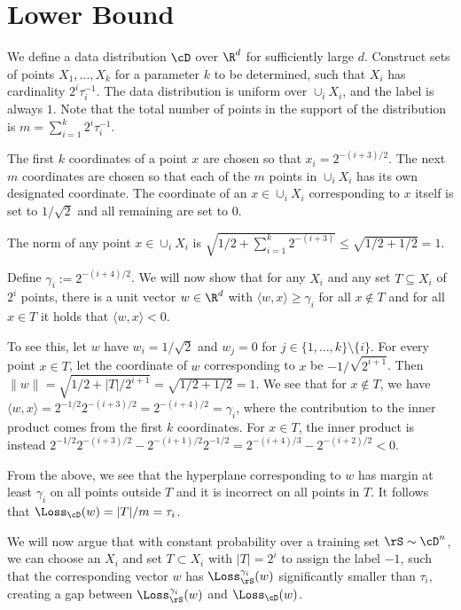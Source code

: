 \section{Lower Bound}
We define a data distribution $\cD$ over $\R^d$ for sufficiently large $d$. Construct sets of points $X_1,\dots,X_k$ for a parameter $k$ to be determined, such that $X_i$ has cardinality $2^i \tau_i^{-1}$. The data distribution is uniform over $\cup_i X_i$, and the label is always $1$. Note that the total number of points in the support of the distribution is $m=\sum_{i=1}^k 2^i \tau_i^{-1}$. 

The first $k$ coordinates of a point $x$ are chosen so that $x_i = 2^{-(i+3)/2}$. The next $m$ coordinates are chosen so that each of the $m$ points in $\cup_i X_i$ has its own designated coordinate. The coordinate of an $x \in \cup_i X_i$ corresponding to $x$ itself is set to $1/\sqrt{2}$ and all remaining are set to $0$.

The norm of any point $x \in \cup_i X_i$ is $\sqrt{1/2 + \sum_{i=1}^k 2^{-(i+3)}} \leq \sqrt{1/2 + 1/2} = 1$.

Define $\gamma_i := 2^{-(i+4)/2}$. We will now show that for any $X_i$ and any set $T \subseteq X_i$ of $2^i$ points, there is a unit vector $w \in \R^d$ with $\langle w, x\rangle \geq \gamma_i$ for all $x \notin T$ and for all $x \in T$ it holds that $\langle w, x \rangle < 0$.

To see this, let $w$ have $w_i = 1/\sqrt{2}$ and $w_j = 0$ for $j \in \{1,\dots,k\} \setminus \{i\}$. For every point $x \in T$, let the coordinate of $w$ corresponding to $x$ be $-1/\sqrt{2^{i+1}}$. Then $\|w\| = \sqrt{1/2 + |T|/2^{i+1}} = \sqrt{1/2 + 1/2}=1$. We see that for $x \notin T$, we have $\langle w, x\rangle = 2^{-1/2} 2^{-(i+3)/2} = 2^{-(i+4)/2} = \gamma_i$, where the contribution to the inner product comes from the first $k$ coordinates. For $x \in T$, the inner product is instead $2^{-1/2} 2^{-(i+3)/2} - 2^{-(i+1)/2} 2^{-1/2} = 2^{-(i+4)/3}-2^{-(i+2)/2} < 0$.

From the above, we see that the hyperplane corresponding to $w$ has margin at least $\gamma_i$ on all points outside $T$ and it is incorrect on all points in $T$. It follows that $\Loss_{\cD}(w) = |T|/m = \tau_i$.

We will now argue that with constant probability over a training set $\rS \sim \cD^n$, we can choose an $X_i$ and set $T \subset X_i$ with $|T|=2^i$ to assign the label $-1$, such that the corresponding vector $w$ has $\Loss^{\gamma_i}_{\rS}(w)$ significantly smaller than $\tau_i$, creating a gap between $\Loss^{\gamma_i}_{\rS}(w)$ and $\Loss_\cD(w)$.




